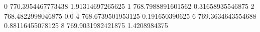 0 770.3954467773438 1.91314697265625
1 768.7988891601562 0.31658935546875
2 768.4822998046875 0.0
4 768.6739501953125 0.191650390625
6 769.3634643554688 0.88116455078125
8 769.9031982421875 1.4208984375
